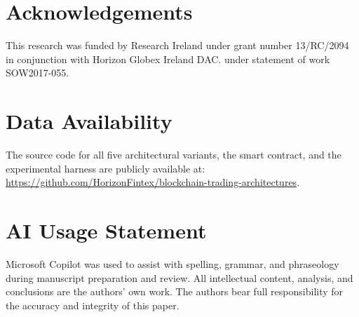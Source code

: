 \section*{Acknowledgements}
This research was funded by Research Ireland under grant number 13/RC/2094 in conjunction with Horizon Globex Ireland DAC. under statement of work SOW2017-055.

\section*{Data Availability}
The source code for all five architectural variants, the smart contract, and the experimental harness are publicly available at: \url{https://github.com/HorizonFintex/blockchain-trading-architectures}.

\section*{AI Usage Statement}
Microsoft Copilot was used to assist with spelling, grammar, and phraseology during manuscript preparation and review. All intellectual content, analysis, and conclusions are the authors' own work. The authors bear full responsibility for the accuracy and integrity of this paper.
